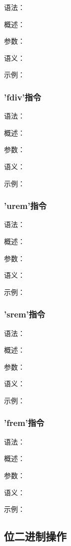 \documentclass[12pt,a4paper]{article}
\begin{document}
{语法：

概述：

参数：

语义：

示例：


\subsubsection{'fdiv'指令} %

语法：

概述：

参数：

语义：

示例：


\subsubsection{'urem'指令} %

语法：

概述：

参数：

语义：

示例：


\subsubsection{'srem'指令} %

语法：

概述：

参数：

语义：

示例：


\subsubsection{'frem'指令} %

语法：

概述：

参数：

语义：

示例：


\subsection{位二进制操作}

}
\end{document}
